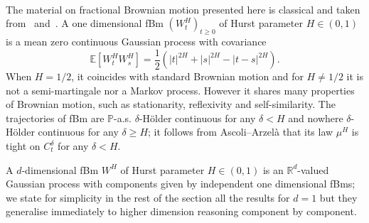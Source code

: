 \documentclass[10pt]{article}
\begin{document}
\

The material on fractional Brownian motion presented here is classical and
taken from~{\cite{nualart2006}} and~{\cite{picard}}. A one dimensional fBm
$(W^H_t)_{t \geqslant 0}$ of Hurst parameter $H \in (0, 1)$ is a mean zero
continuous Gaussian process with covariance
\[ \mathbb{E} [W^H_t W^H_s] = \frac{1}{2} (| t |^{2 H} + | s |^{2 H} - | t - s
   |^{2 H}) . \]
When $H = 1 / 2$, it coincides with standard Brownian motion and for $H \neq 1
/ 2$ it is not a semi-martingale nor a Markov process. However it shares many
properties of Brownian motion, such as stationarity, reflexivity and
self-similarity. The trajectories of fBm are $\mathbb{P}$-a.s.
$\delta$-H{\"o}lder continuous for any $\delta < H$ and nowhere
$\delta$\mbox{-}H{\"o}lder continuous for any $\delta \geqslant H$; it follows
from Ascoli--Arzel{\`a} that its law $\mu^H$ is tight on $C^{\delta}_t$ for
any $\delta < H$.

A $d$\mbox{-}dimensional fBm $W^H$ of Hurst parameter $H \in (0, 1)$ is an
$\mathbb{R}^d$\mbox{-}valued Gaussian process with components given by
independent one dimensional fBms; we state for simplicity in the rest of the
section all the results for $d = 1$ but they generalise immediately to higher
dimension reasoning component by component.
\end{document}
